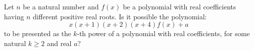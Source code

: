 Let $n$ be a natural number and $f(x)$ be a polynomial with real coefficients having $n$ different positive real roots. Is it possible the polynomial:
$$x(x+1)(x+2)(x+4)f(x)+a$$to be presented as the $k$-th power of a polynomial with real coefficients, for some natural $k\geq 2$ and real $a$?